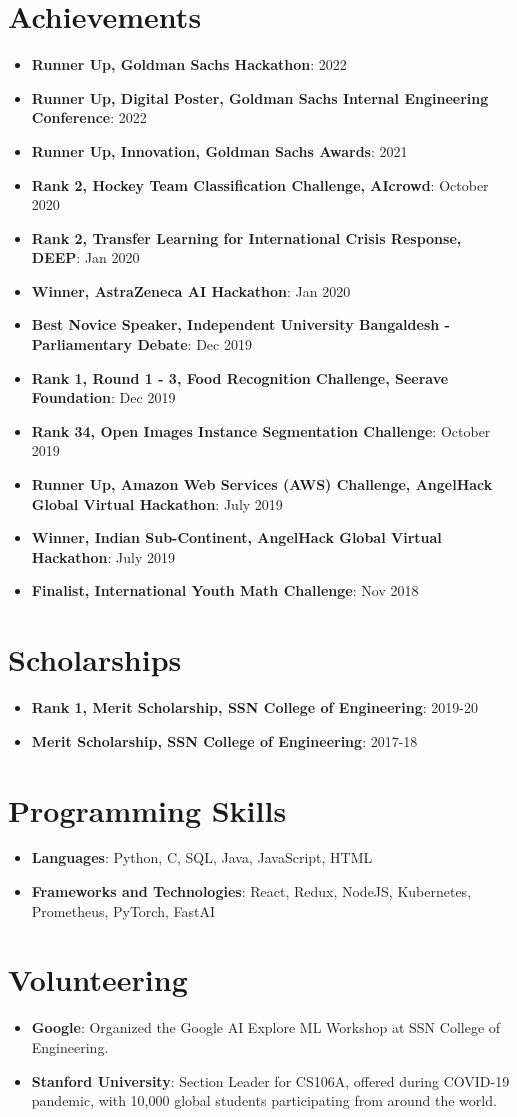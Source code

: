 \documentclass[letterpaper,11pt]{article}
\newcommand{\resumeItem}[2]{
  \item\small{
    \textbf{#1}{: #2 \vspace{-2pt}}
  }
}
\newcommand{\resumeSubItem}[2]{\resumeItem{#1}{#2}\vspace{-4pt}}
\newcommand{\resumeSubHeadingListStart}{\begin{itemize}[leftmargin=*]}
\newcommand{\resumeSubHeadingListEnd}{\end{itemize}}
\begin{document}
\section{Achievements}
  \resumeSubHeadingListStart
  \resumeSubItem
    {Runner Up, Goldman Sachs Hackathon}{2022}
  \resumeSubItem
    {Runner Up, Digital Poster, Goldman Sachs Internal Engineering Conference}{2022}
  \resumeSubItem
    {Runner Up, Innovation, Goldman Sachs Awards}{2021}
  \resumeSubItem
    {Rank 2, Hockey Team Classification Challenge, AIcrowd}{October 2020}
  \resumeSubItem
    {Rank 2, Transfer Learning for International Crisis Response, DEEP}{Jan 2020}
  \resumeSubItem
    {Winner, AstraZeneca AI Hackathon}{Jan 2020}
  \resumeSubItem
    {Best Novice Speaker, Independent University Bangaldesh - Parliamentary Debate}{Dec 2019}
  \resumeSubItem
    {Rank 1, Round 1 - 3, Food Recognition Challenge, Seerave Foundation}{Dec 2019}
  \resumeSubItem
    {Rank 34, Open Images Instance Segmentation Challenge}{October 2019}
  \resumeSubItem
    {Runner Up, Amazon Web Services (AWS) Challenge, AngelHack Global Virtual Hackathon}{July 2019}
  \resumeSubItem
    {Winner, Indian Sub-Continent, AngelHack Global Virtual Hackathon}{July 2019}
  \resumeSubItem
    {Finalist, International Youth Math Challenge}{Nov 2018}

  \resumeSubHeadingListEnd
\section{Scholarships}
  \resumeSubHeadingListStart
    \resumeSubItem
  {Rank 1, Merit Scholarship, SSN College of Engineering}{2019-20}
      \resumeSubItem
  {Merit Scholarship, SSN College of Engineering}{2017-18}
\resumeSubHeadingListEnd

\section{Programming Skills}
  \resumeSubHeadingListStart
   \item{
     \textbf{Languages}{: Python, C,  SQL, Java, JavaScript, HTML}
      }
      \item{
       \textbf{Frameworks and Technologies}{: React, Redux, NodeJS, Kubernetes, Prometheus, PyTorch, FastAI}
    }
  \resumeSubHeadingListEnd

\section{Volunteering}
\resumeSubHeadingListStart
\resumeItem{Google}{Organized the Google AI Explore ML Workshop at SSN College of Engineering.}
\resumeItem{Stanford University}{Section Leader for CS106A, offered during COVID-19 pandemic, with 10,000 global students participating from around the world.}
\resumeSubHeadingListEnd
\iffalse
\section{Blog}
I also run a blog which you can find at \href{https://rohitmidha23.github.io/blog}{rohitmidha23.github.io/blog}. It has had over 30k page views.
\fi
\end{document}
